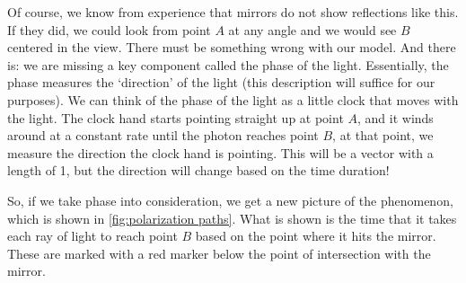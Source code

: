 Of course, we know from experience that mirrors do not show reflections like this. If they did, we could look from point $A$ at any angle and we would see $B$ centered in the view. There must be something wrong with our model. And there is: we are missing a key component called the phase of the light. Essentially, the phase measures the `direction' of the light (this description will suffice for our purposes). We can think of the phase of the light as a little clock that moves with the light. The clock hand starts pointing straight up at point $A$, and it winds around at a constant rate until the photon reaches point $B$, at that point, we measure the direction the clock hand is pointing. This will be a vector with a length of 1, but the direction will change based on the time duration!

So, if we take phase into consideration, we get a new picture of the phenomenon, which is shown in \autoref{fig:polarization paths}. What is shown is the time that it takes each ray of light to reach point $B$ based on the point where it hits the mirror. These are marked with a red marker below the point of intersection with the mirror.

